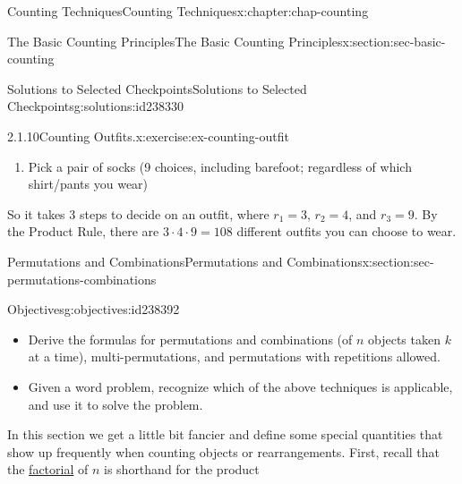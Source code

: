 \documentclass[oneside,10pt,]{book}
\newcommand{\blocktitlefont}{\relax}
\newcommand{\xreffont}{\relax}
\numberwithin{equation}{section}
\begin{document}
\begin{chapterptx}{Counting Techniques}{}{Counting Techniques}{}{}{x:chapter:chap-counting}
\begin{sectionptx}{The Basic Counting Principles}{}{The Basic Counting Principles}{}{}{x:section:sec-basic-counting}
\begin{solutions-subsection}{Solutions to Selected Checkpoints}{}{Solutions to Selected Checkpoints}{}{}{g:solutions:id238330}
\begin{inlineexercisesolution}{2.1.10}{Counting Outfits.}{x:exercise:ex-counting-outfit}
\begin{enumerate}
\item{}Pick a pair of socks (9 choices, including barefoot; regardless of which shirt\slash{}pants you wear)%
\end{enumerate}
So it takes 3 steps to decide on an outfit, where \(r_1 = 3\), \(r_2 = 4\), and \(r_3 = 9\). By the Product Rule, there are \(3 \cdot 4 \cdot 9 = 108\) different outfits you can choose to wear.%
\end{inlineexercisesolution}
\end{solutions-subsection}
\end{sectionptx}
%
%
\typeout{************************************************}
\typeout{************************************************}
%
\begin{sectionptx}{Permutations and Combinations}{}{Permutations and Combinations}{}{}{x:section:sec-permutations-combinations}
\begin{objectives}{Objectives}{g:objectives:id238392}
%
\begin{itemize}[label=\textbullet]
\item{}Derive the formulas for permutations and combinations (of \(n\) objects taken \(k\) at a time), multi-permutations, and permutations with repetitions allowed.%
\item{}Given a word problem, recognize which of the above techniques is applicable, and use it to solve the problem.%
\end{itemize}
\end{objectives}
In this section we get a little bit fancier and define some special quantities that show up frequently when counting objects or rearrangements. First, recall that the \hyperref[x:definition:def-factorial]{factorial} of \(n\) is shorthand for the product%

\end{sectionptx}
\end{chapterptx}
\end{document}
